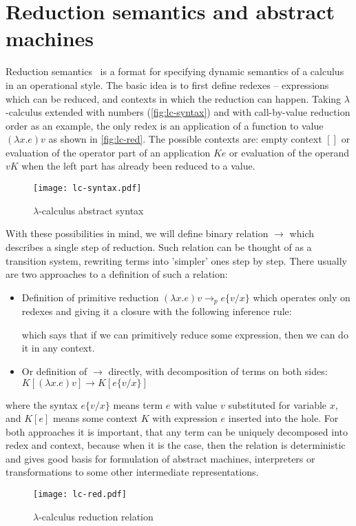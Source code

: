 \documentclass[inz, english, longabstract]{iithesis}
\newcommand{\LC}{\(\lambda\)-calculus}
\begin{document}
\section{Reduction semantics and abstract machines}
Reduction semantics~\cite{Felleisen2009} is a format for specifying dynamic semantics of a calculus in an operational style.
The basic idea is to first define redexes -- expressions which can be reduced, and contexts in which the reduction can happen.
Taking \LC{} extended with numbers (\autoref{fig:lc-syntax}) and with call-by-value reduction order as an example, the only redex is an application of a function to value $ (\lambda x . e) v $ as shown in \autoref{fig:lc-red}.
The possible contexts are: empty context $[]$ or evaluation of the operator part of an application $ K e $ or evaluation of the operand $ v K $ when the left part has already been reduced to a value.
\begin{figure}[t]
  \texttt{[image: lc-syntax.pdf]}
  \caption{\LC{} abstract syntax}
  \label{fig:lc-syntax}
\end{figure}
With these possibilities in mind, we will define binary relation $ \longrightarrow $ which describes a single step of reduction.
Such relation can be thought of as a transition system, rewriting terms into 'simpler' ones step by step.
There usually are two approaches to a definition of such a relation:
\begin{itemize}
  \item Definition of primitive reduction $ (\lambda x . e) v \longrightarrow_p e\{v/x\} $ which operates only on redexes and giving it a closure with the following inference rule:
  
  \begin{prooftree}
  \end{prooftree}

  which says that if we can primitively reduce some expression, then we can do it in any context.
  \item Or definition of $ \longrightarrow $ directly, with decomposition of terms on both sides: $ K[(\lambda x . e) v] \longrightarrow K[e\{v/x\}] $
\end{itemize}
where the syntax $ e\{v/x\} $ means term $ e $ with value $ v $ substituted for variable $ x $, and $ K[e] $ means some context $ K $ with expression $ e $ inserted into the hole.
For both approaches it is important, that any term can be uniquely decomposed into redex and context, because when it is the case, then the relation is deterministic and gives good basis for formulation of abstract machines, interpreters or transformations to some other intermediate representations.
\begin{figure}
  \texttt{[image: lc-red.pdf]} 
  \caption{\LC{} reduction relation}
  \label{fig:lc-red}
\end{figure}
\end{document}
